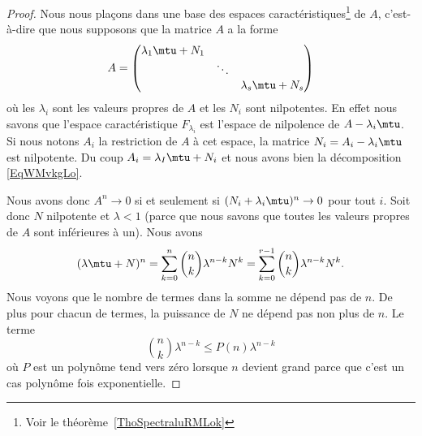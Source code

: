 \begin{proof}
    Nous nous plaçons dans une base des espaces caractéristiques\footnote{Voir le théorème~\ref{ThoSpectraluRMLok}} de \( A\), c'est-à-dire que nous supposons que la matrice \( A\) a la forme
    \begin{equation}        \label{EqWMvkgLo}
        A=\begin{pmatrix}
            \lambda_1\mtu+N_1    &       &       \\
                &   \ddots    &       \\
                &       &   \lambda_s\mtu+N_s
        \end{pmatrix}
    \end{equation}
    où les \( \lambda_i\) sont les valeurs propres de \( A\) et les \( N_i\) sont nilpotentes. En effet nous savons que l'espace caractéristique \( F_{\lambda_i}\) est l'espace de nilpolence de \( A-\lambda_i\mtu\). Si nous notons \( A_i\) la restriction de \( A\) à cet espace, la matrice \( N_i=A_i-\lambda_i\mtu\) est nilpotente. Du coup \( A_i=\lambda_I\mtu+N_i\) et nous avons bien la décomposition \eqref{EqWMvkgLo}.

    Nous avons donc \( A^n\to 0\) si et seulement si \( (N_i+\lambda_i\mtu)^n\to 0\) pour tout \( i\). Soit donc \( N\) nilpotente et \( \lambda<1\) (parce que nous savons que toutes les valeurs propres de \( A\) sont inférieures à un). Nous avons
    \begin{equation}
            (\lambda\mtu+N)^n=\sum_{k=0}^n\binom{ n }{ k }\lambda^{n-k}N^{k}
            =\sum_{k=0}^{r-1}\binom{ n }{ k }\lambda^{n-k}N^{k}.
    \end{equation}
    Nous voyons que le nombre de termes dans la somme ne dépend pas de \( n\). De plus pour chacun de termes, la puissance de \( N\) ne dépend pas non plus de \( n\). Le terme
    \begin{equation}
        \binom{ n }{ k }\lambda^{n-k}\leq P(n)\lambda^{n-k}
    \end{equation}
    où \( P\) est un polynôme tend vers zéro lorsque \( n\) devient grand parce que c'est un cas polynôme fois exponentielle.
\end{proof}

